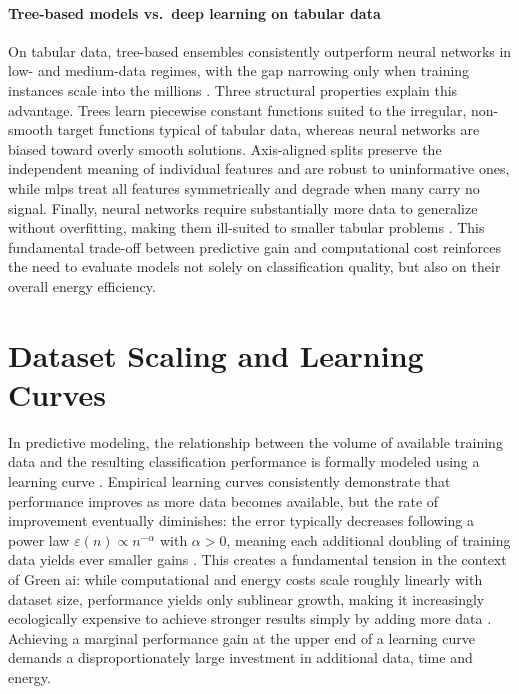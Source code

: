 \paragraph{Tree-based models vs.\ deep learning on tabular data}
On tabular data, tree-based ensembles consistently outperform neural networks in low- and medium-data regimes, with the gap narrowing only when training instances scale into the millions \parencite{grinsztajnWhyTreebasedModels2022a, gorishniyRevisitingDeepLearning2021a}. Three structural properties explain this advantage. Trees learn piecewise constant functions suited to the irregular, non-smooth target functions typical of tabular data, whereas neural networks are biased toward overly smooth solutions. Axis-aligned splits preserve the independent meaning of individual features and are robust to uninformative ones, while \glspl{mlp} treat all features symmetrically and degrade when many carry no signal. Finally, neural networks require substantially more data to generalize without overfitting, making them ill-suited to smaller tabular problems \parencite{grinsztajnWhyTreebasedModels2022a}. This fundamental trade-off between predictive gain and computational cost reinforces the need to evaluate models not solely on classification quality, but also on their overall energy efficiency.

\section{Dataset Scaling and Learning Curves}
\label{sec:theoretical_learning_curves}

In predictive modeling, the relationship between the volume of available training data and the resulting classification performance is formally modeled using a learning curve \parencite{koshuteRecommendingTrainingSet2021}. Empirical learning curves consistently demonstrate that performance improves as more data becomes available, but the rate of improvement eventually diminishes: the error typically decreases following a power law $\varepsilon(n) \propto n^{-\alpha}$ with $\alpha > 0$, meaning each additional doubling of training data yields ever smaller gains \parencite{koshuteRecommendingTrainingSet2021, hastieElementsStatisticalLearning2017}. This creates a fundamental tension in the context of Green \gls{ai}: while computational and energy costs scale roughly linearly with dataset size, performance yields only sublinear growth, making it increasingly ecologically expensive to achieve stronger results simply by adding more data \parencite{schwartzGreenAI2020}. Achieving a marginal performance gain at the upper end of a learning curve demands a disproportionately large investment in additional data, time and energy.

